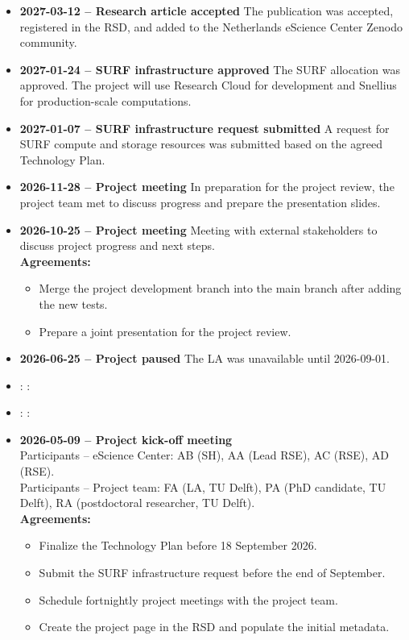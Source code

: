 \begin{itemize}[
  leftmargin=*,
  label={},
  itemsep=2pt,
  topsep=2pt,
  parsep=0pt,
  partopsep=0pt
]

\item \textbf{2027-03-12 -- Research article accepted}
The publication was accepted, registered in the RSD, and added to the Netherlands eScience Center Zenodo community.
\item \textbf{2027-01-24 -- SURF infrastructure approved}
The SURF allocation was approved. The project will use Research Cloud for development and Snellius for production-scale computations.
\item \textbf{2027-01-07 -- SURF infrastructure request submitted}
A request for SURF compute and storage resources was submitted based on the agreed Technology Plan.
\item \textbf{2026-11-28 -- Project meeting}
In preparation for the project review, the project team met to discuss progress and prepare the presentation slides.
\item \textbf{2026-10-25 -- Project meeting}
Meeting with external stakeholders to discuss project progress and next steps. \\
\textbf{Agreements:}
\begin{itemize}[
  leftmargin=1.5em,
  itemsep=0pt,
  topsep=2pt,
  parsep=0pt,
  partopsep=0pt
]
\item Merge the project development branch into the main branch after adding the new tests.
\item Prepare a joint presentation for the project review.
\end{itemize}
\item \textbf{2026-06-25 -- Project paused}
The LA was unavailable until 2026-09-01.
\item \hspace{0.5em} : \hspace{0.5em} :
\item \hspace{0.5em} : \hspace{0.5em} :
\item \textbf{2026-05-09 -- Project kick-off meeting}\\
Participants -- eScience Center:
AB (SH), AA (Lead RSE), AC (RSE), AD (RSE).\\
Participants -- Project team:
FA (LA, TU Delft), PA (PhD candidate, TU Delft), RA (postdoctoral researcher, TU Delft).\\
\textbf{Agreements:}
\begin{itemize}[
  leftmargin=1.5em,
  itemsep=0pt,
  topsep=2pt,
  parsep=0pt,
  partopsep=0pt
]
\item Finalize the Technology Plan before 18 September 2026.
\item Submit the SURF infrastructure request before the end of September.
\item Schedule fortnightly project meetings with the project team.
\item Create the project page in the RSD and populate the initial metadata.
\end{itemize}
\end{itemize}